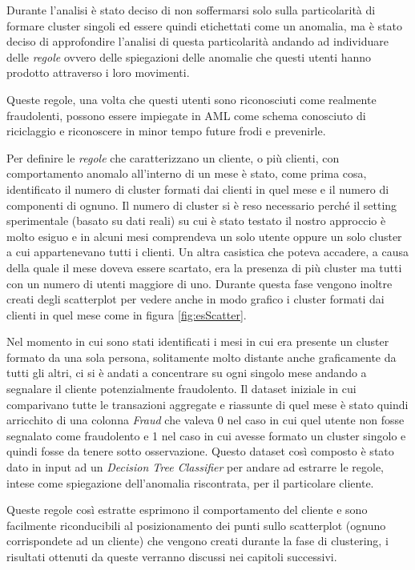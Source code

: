 Durante l'analisi è stato deciso di non soffermarsi solo sulla particolarità di formare cluster singoli ed essere quindi etichettati come un anomalia, ma è stato deciso di approfondire l'analisi di questa particolarità andando ad individuare delle \textit{regole} ovvero delle spiegazioni delle anomalie che questi utenti hanno prodotto attraverso i loro movimenti.

Queste regole, una volta che questi utenti sono riconosciuti come realmente fraudolenti, possono essere impiegate in AML come schema conosciuto di riciclaggio e riconoscere in minor tempo future frodi e prevenirle.

Per definire le \textit{regole} che caratterizzano un cliente, o più clienti, con comportamento anomalo all'interno di un mese è stato, come prima cosa, identificato il numero di cluster formati dai clienti in quel mese e il numero di componenti di ognuno. Il numero di cluster si è reso necessario perché il setting sperimentale (basato su dati reali) su cui è stato testato il nostro approccio è molto esiguo e in alcuni mesi comprendeva un solo utente oppure un solo cluster a cui appartenevano tutti i clienti. Un altra casistica che poteva accadere, a causa della quale il mese doveva essere scartato, era la presenza di più cluster ma tutti con un numero di utenti maggiore di uno.
Durante questa fase vengono inoltre creati degli scatterplot per vedere anche in modo grafico i cluster formati dai clienti in quel mese come in figura \ref{fig:esScatter}.

Nel momento in cui sono stati identificati i mesi in cui era presente un cluster formato da una sola persona, solitamente molto distante anche graficamente da tutti gli altri, ci si è andati a concentrare su ogni singolo mese andando a segnalare il cliente potenzialmente fraudolento.
Il dataset iniziale in cui comparivano tutte le transazioni aggregate e riassunte di quel mese è stato quindi arricchito di una colonna \textit{Fraud} che valeva 0 nel caso in cui quel utente non fosse segnalato come fraudolento e 1 nel caso in cui avesse formato un cluster singolo e quindi fosse da tenere sotto osservazione.
Questo dataset così composto è stato dato in input ad un \textit{Decision Tree Classifier }per andare ad estrarre le regole, intese come spiegazione dell'anomalia riscontrata, per il particolare cliente. 

Queste regole così estratte esprimono il comportamento del cliente e sono facilmente riconducibili al posizionamento dei punti sullo scatterplot (ognuno corrispondete ad un cliente) che vengono creati durante la fase di clustering, i risultati ottenuti da queste verranno discussi nei capitoli successivi. 

